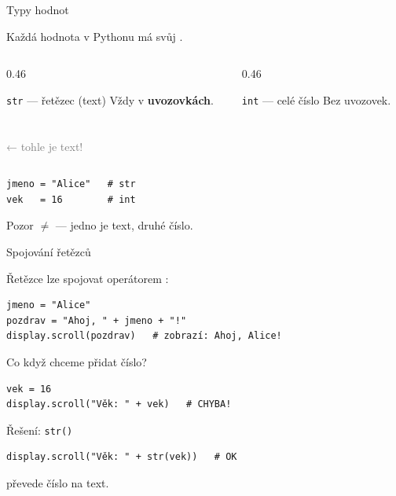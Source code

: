\begin{frame}[fragile]{Typy hodnot}

  Každá hodnota v Pythonu má svůj .

  \bigskip
  \begin{columns}[T]
    \begin{column}{0.46\textwidth}
      \begin{block}{\texttt{str} — řetězec (text)}
        Vždy v \textbf{uvozovkách}.\\[4pt]
        \\
        \\
          \textcolor{gray}{\small\quad ← tohle je text!}
      \end{block}
    \end{column}
    \begin{column}{0.46\textwidth}
      \begin{block}{\texttt{int} — celé číslo}
        Bez uvozovek.\\[4pt]
        \\
        \\
      \end{block}
    \end{column}
  \end{columns}

  \bigskip
  \begin{lstlisting}
jmeno = "Alice"   # str
vek   = 16        # int
  \end{lstlisting}

  \pause
  \begin{alertblock}{Pozor}
     $\neq$  \quad — jedno je text, druhé číslo.
  \end{alertblock}
\end{frame}

\begin{frame}[fragile]{Spojování řetězců}

  Řetězce lze spojovat operátorem \pyinline{+}:

  \begin{lstlisting}
jmeno = "Alice"
pozdrav = "Ahoj, " + jmeno + "!"
display.scroll(pozdrav)   # zobrazí: Ahoj, Alice!
  \end{lstlisting}

  \pause\bigskip
  Co když chceme přidat číslo?

  \begin{lstlisting}
vek = 16
display.scroll("Věk: " + vek)   # CHYBA!
  \end{lstlisting}

  \pause
  \begin{exampleblock}{Řešení: \texttt{str()}}
    \begin{lstlisting}
display.scroll("Věk: " + str(vek))   # OK
    \end{lstlisting}
     převede číslo na text.
  \end{exampleblock}
\end{frame}


